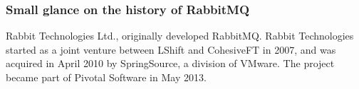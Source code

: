 \subsubsection{Small glance on the history of RabbitMQ}

Rabbit Technologies Ltd., originally developed RabbitMQ.
Rabbit Technologies started as a joint venture between
LShift and CohesiveFT in 2007\cite{amjad24}, and was
acquired in April 2010 by SpringSource, a division of
VMware.\cite{amjad25} The project became part of Pivotal
Software in May 2013.\cite{amjad26}

